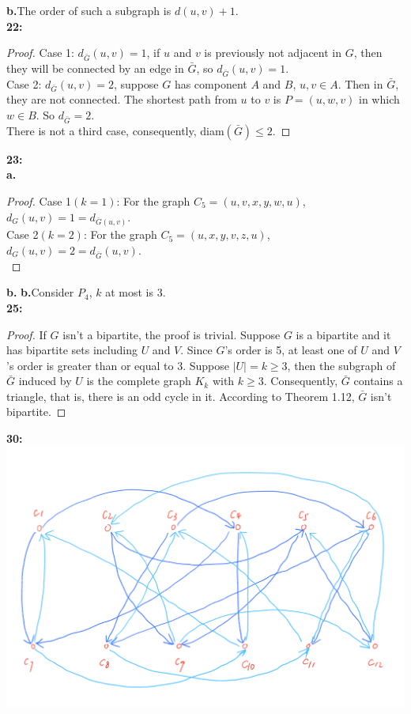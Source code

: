 \documentclass[11pt]{article}
\begin{document}
\textbf{b.}The order of such a subgraph is $d(u,v)+1$.\\
\textbf{22:} 
\begin{proof}
Case 1: $d_{\bar{G}}(u,v)=1$, if $u$ and $v$ is previously not adjacent in $G$, then they will be connected by an edge in $\bar{G}$, so $d_{\bar{G}}(u,v)=1$.\\
Case 2: $d_{\bar{G}}(u,v)=2$, suppose $G$ has component $A$ and $B$, $u,v\in A$. Then in $\bar{G}$, they are not connected. The shortest path from $u$ to $v$ is $P=(u,w,v)$ in which $w\in B$. So $d_{\bar{G}}=2$.\\
There is not a third case, consequently, diam$(\bar{G})\le2$.
\end{proof}
\textbf{23:}\\
\textbf{a.}
\begin{proof}%
Case 1$(k=1)$: For the graph $C_5=(u,v,x,y,w,u)$, $d_G(u,v)=1=d_{\bar{G}(u,v)}$.\\
Case 2$(k=2)$: For the graph $C_5=(u,x,y,v,z,u)$, $d_G(u,v)=2=d_{\bar{G}}(u,v)$.\\
\end{proof}
\textbf{b.}
\textbf{b.}Consider $P_4$, $k$ at most is 3.\\
\textbf{25:}
\begin{proof}
If $G$ isn't a bipartite, the proof is trivial. Suppose $G$ is a bipartite and it has bipartite sets including $U$ and $V$. Since $G$'s order is 5, at least one of $U$ and $V$'s order is greater than or equal to 3. Suppose $|U|=k\ge3$, then the subgraph of $\bar{G}$ induced by $U$ is the complete graph $K_k$ with $k\ge3$. Consequently, $\bar{G}$ contains a triangle, that is, there is an odd cycle in it. According to Theorem 1.12, $\bar{G}$ isn't bipartite.
\end{proof}
\textbf{30:}\\
\includegraphics[scale=0.25]{3.png}\\
\end{document}
